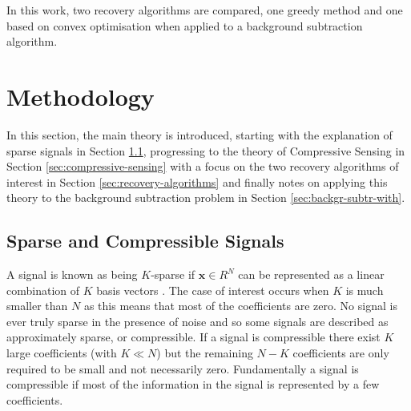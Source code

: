 \documentclass[conference]{IEEEtran}
\begin{document}
In this work, two recovery algorithms are compared, one greedy method and one based on convex optimisation when applied to a background subtraction algorithm. 


\section{Methodology}
\label{sec:background}

In this section, the main theory is introduced, starting with the explanation of sparse signals in Section \ref{sec:compressible-signals}, progressing to the theory of Compressive Sensing in Section \ref{sec:compressive-sensing} with a focus on the two recovery algorithms of interest in Section \ref{sec:recovery-algorithms} and finally notes on applying this theory to the background subtraction problem in Section \ref{sec:backgr-subtr-with}.

\subsection{Sparse and Compressible Signals}

\label{sec:compressible-signals}
A signal is known as being $K$-sparse if $\boldsymbol{x} \in R^N$ can be represented as a linear combination of $K$ basis vectors \cite{Baraniuk2007}. The case of interest occurs when $K$ is much smaller than $N$ as this means that most of the coefficients are zero. No signal is ever truly sparse in the presence of noise and so some signals are described as approximately sparse, or compressible. If a signal is compressible there exist $K$ large coefficients (with $K \ll N$) but the remaining $N-K$ coefficients are only required to be small and not necessarily zero. Fundamentally a signal is compressible if most of the information in the signal is represented by a few coefficients.
\end{document}
